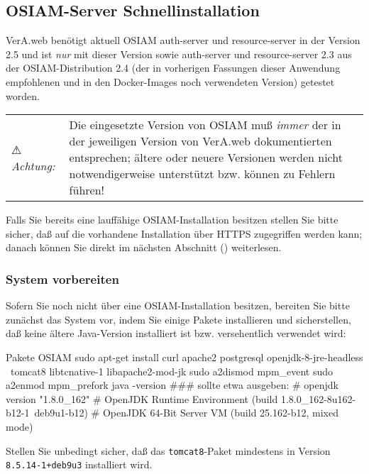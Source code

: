 \documentclass{tarentanleitung}
\newcommand{\vwiaversosiam}{2.5}
\begin{document}
\subsection{OSIAM-Server Schnellinstallation}\label{subsec:setup-osiam-fast}

VerA.web benötigt aktuell OSIAM auth-server und resource-server in
der Version \vwiaversosiam{} und ist \emph{nur} mit dieser Version
sowie auth-server und resource-server 2.3 aus der OSIAM-Distribution
2.4 (der in vorherigen Fassungen dieser Anwendung empfohlenen und in
den Docker-Images noch verwendeten Version) getestet worden.\keinumbruch

\begin{tabu}{@{}l@{ }X@{}}
⚠ \emph{Achtung:} & Die eingesetzte Version von OSIAM muß \emph{immer} der
in der jeweiligen Version von VerA.web dokumentierten entsprechen; ältere
oder neuere Versionen werden nicht notwendigerweise unterstützt bzw. können
zu Fehlern führen!
\end{tabu}

Falls Sie bereits eine lauffähige OSIAM-Installation besitzen stellen
Sie bitte sicher, daß auf die vorhandene Installation über HTTPS
zugegriffen werden kann; danach können Sie direkt im nächsten Abschnitt
() weiterlesen.

\subsubsection{System vorbereiten}\label{subsubsec:setup-osiam-prepare}

\begin{minipage}{\linewidth}
Sofern Sie noch nicht über eine OSIAM-Installation besitzen, bereiten
Sie bitte zunächst das System vor, indem Sie einige Pakete installieren
und sicherstellen, daß keine ältere Java-Version installiert ist bzw.
versehentlich verwendet wird:

\begin{lstdump}{Pakete OSIAM}
sudo apt-get install curl apache2 postgresql openjdk-8-jre-headless \
    tomcat8 libtcnative-1 libapache2-mod-jk
sudo a2dismod mpm_event
sudo a2enmod mpm_prefork
java -version
### sollte etwa ausgeben:
# openjdk version "1.8.0_162"
# OpenJDK Runtime Environment (build 1.8.0_162-8u162-b12-1~deb9u1-b12)
# OpenJDK 64-Bit Server VM (build 25.162-b12, mixed mode)
\end{lstdump}

Stellen Sie unbedingt sicher, daß das \texttt{tomcat8}-Paket mindestens
in Version \texttt{8.5.14-1+deb9u3} installiert wird.
\end{minipage}
\end{document}
